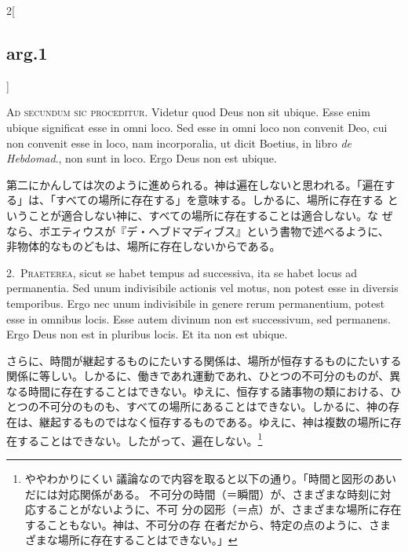 \documentclass[paper=a4paper,fontsize=10pt,jafontsize=9pt,titlepage]{jlreq}
\begin{document}
\begin{paracol}{2}[\subsection{arg.1}]

{\huge A}{\scshape d secundum sic proceditur}. Videtur quod Deus non sit
 ubique. Esse enim ubique significat esse in omni loco. Sed esse in omni
 loco non convenit Deo, cui non convenit esse in loco, nam incorporalia,
 ut dicit Boetius, in libro {\itshape de Hebdomad}., non sunt in loco. Ergo Deus
 non est ubique.

\switchcolumn

第二にかんしては次のように進められる。神は遍在しないと思われる。「遍在す
 る」は、「すべての場所に存在する」を意味する。しかるに、場所に存在する
 ということが適合しない神に、すべての場所に存在することは適合しない。な
 ぜなら、ボエティウスが『デ・ヘブドマディブス』という書物で述べるように、
 非物体的なものどもは、場所に存在しないからである。


2.~{\scshape Praeterea}, sicut se habet tempus ad successiva, ita se habet
 locus ad permanentia. Sed unum indivisibile actionis vel motus, non
 potest esse in diversis temporibus. Ergo nec unum indivisibile in
 genere rerum permanentium, potest esse in omnibus locis. Esse autem
 divinum non est successivum, sed permanens. Ergo Deus non est in
 pluribus locis. Et ita non est ubique.

\switchcolumn

さらに、時間が継起するものにたいする関係は、場所が恒存するものにたいする
 関係に等しい。しかるに、働きであれ運動であれ、ひとつの不可分のものが、異
 なる時間に存在することはできない。ゆえに、恒存する諸事物の類における、ひ
 とつの不可分のものも、すべての場所にあることはできない。しかるに、神の存
 在は、継起するものではなく恒存するものである。ゆえに、神は複数の場所に存
 在することはできない。したがって、遍在しない。\footnote{ややわかりにくい
 議論なので内容を取ると以下の通り。「時間と図形のあいだには対応関係がある。
 不可分の時間（＝瞬間）が、さまざまな時刻に対応することがないように、不可
 分の図形（＝点）が、さまざまな場所に存在することもない。神は、不可分の存
 在者だから、特定の点のように、さまざまな場所に存在することはできない。」}



\end{paracol}
\end{document}
